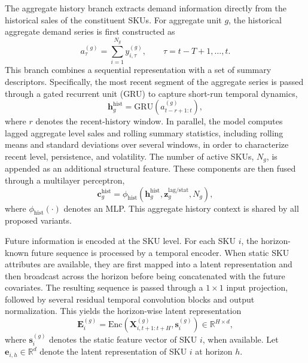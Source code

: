 \documentclass[12pt]{article}
\begin{document}
The aggregate history branch extracts demand information directly from the historical sales of the constituent SKUs. For aggregate unit $g$, the historical aggregate demand series is first constructed as
\begin{equation}
  a^{(g)}_{\tau}
  =
  \sum_{i=1}^{N_g} y^{(g)}_{i,\tau},
  \qquad
  \tau=t-T+1,\ldots,t.
\end{equation}
This branch combines a sequential representation with a set of summary descriptors. Specifically, the most recent segment of the aggregate series is passed through a gated recurrent unit (GRU) \parencite{cho-etal-2014-learning} to capture short-run temporal dynamics,
\begin{equation}
  \mathbf{h}^{\mathrm{hist}}_g
  =
  \mathrm{GRU}\!\left(a^{(g)}_{t-r+1:t}\right),
\end{equation}
where $r$ denotes the recent-history window. In parallel, the model computes lagged aggregate level sales and rolling summary statistics, including rolling means and standard deviations over several windows, in order to characterize recent level, persistence, and volatility. The number of active SKUs, $N_g$, is appended as an additional structural feature. These components are then fused through a multilayer perceptron,
\begin{equation}
  \mathbf{c}^{\mathrm{hist}}_g
  =
  \phi_{\mathrm{hist}}
  \left(
  \mathbf{h}^{\mathrm{hist}}_g,
  \mathbf{z}^{\mathrm{lag/stat}}_g,
  N_g
  \right),
\end{equation}
where $\phi_{\mathrm{hist}}(\cdot)$ denotes an MLP. This aggregate history context is shared by all proposed variants.

Future information is encoded at the SKU level. For each SKU $i$, the horizon-known future sequence is processed by a temporal encoder. When static SKU attributes are available, they are first mapped into a latent representation and then broadcast across the horizon before being concatenated with the future covariates. The resulting sequence is passed through a $1\times1$ input projection, followed by several residual temporal convolution blocks and output normalization. This yields the horizon-wise latent representation
\begin{equation}
  \mathbf{E}^{(g)}_i
  =
  \mathrm{Enc}
  \left(
  \mathbf{X}^{(g)}_{i,t+1:t+H},
  \mathbf{s}^{(g)}_i
  \right)
  \in
  \mathbb{R}^{H \times d},
\end{equation}
where $\mathbf{s}^{(g)}_i$ denotes the static feature vector of SKU $i$, when available. Let $\mathbf{e}_{i,h}\in\mathbb{R}^{d}$ denote the latent representation of SKU $i$ at horizon $h$.
\end{document}

